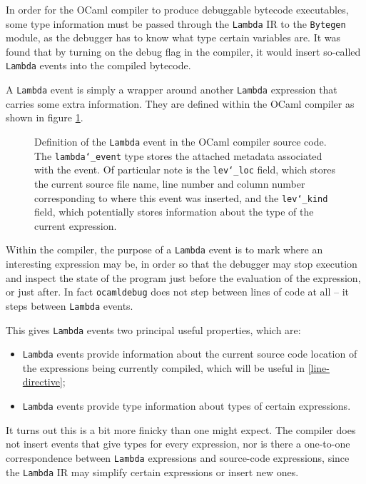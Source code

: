 \documentclass[12pt,a4paper,twoside,openright]{report}
\begin{document}
In order for the OCaml compiler to produce debuggable bytecode executables, 
some type information must be passed through the \texttt{Lambda} IR to the 
\texttt{Bytegen} module, as the debugger has to know what type certain 
variables are. It was found that by turning on the debug flag in the compiler, 
it would insert so-called \texttt{Lambda} events into the compiled bytecode.

A \texttt{Lambda} event is simply a wrapper around another \texttt{Lambda} 
expression that carries some extra information. They are defined within the 
OCaml compiler as shown in figure \ref{fig:levent}.

\begin{figure}
    \label{fig:levent}
    
    \caption{Definition of the \texttt{Lambda} event in the OCaml compiler 
    source code. The \texttt{lambda\char`_event} type stores the attached 
    metadata associated with the event. Of particular note is the 
    \texttt{lev\char`_loc} field, which stores the current source file name, 
    line number and column number corresponding to where this event was 
    inserted, and the \texttt{lev\char`_kind} field, which potentially stores 
    information about the type of the current expression.}
\end{figure}

Within the compiler, the purpose of a \texttt{Lambda} event is to mark where an 
interesting expression may be, in order so that the debugger may stop execution 
and inspect the state of the program just before the evaluation of the 
expression, or just after. In fact \texttt{ocamldebug} does not step between 
lines of code at all -- it steps between \texttt{Lambda} events.

This gives \texttt{Lambda} events two principal useful properties, which are:

\begin{itemize}
\item \texttt{Lambda} events provide information about the current source code 
location of the expressions being currently compiled, which will be useful in 
\ref{line-directive};
\item \texttt{Lambda} events provide type information about types of certain 
expressions.
\end{itemize}

It turns out this is a bit more finicky than one might expect. The compiler 
does not insert events that give types for every expression, nor is there a 
one-to-one correspondence between \texttt{Lambda} expressions and source-code 
expressions, since the \texttt{Lambda} IR may simplify certain expressions or 
insert new ones.
\end{document}
